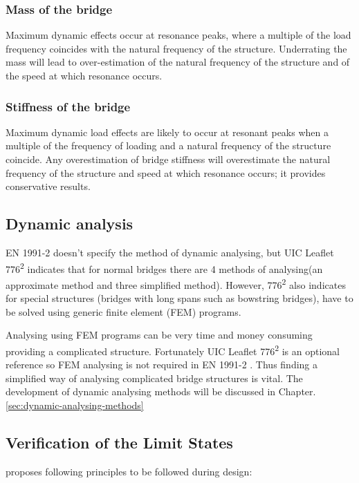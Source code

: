 \subsubsection{Mass of the bridge}
Maximum dynamic effects occur at resonance peaks, where a multiple of the load frequency coincides with the natural frequency of the structure. Underrating the mass will lead to over-estimation of the natural frequency of the structure and of the speed at which resonance occurs.

\subsubsection{Stiffness of the bridge}
Maximum dynamic load effects are likely to occur at resonant peaks when a multiple of the frequency of loading and a natural frequency of the structure coincide. Any overestimation of bridge stiffness will overestimate the natural frequency of the structure and speed at which resonance occurs; it provides conservative results.

\subsection{Dynamic analysis}
EN 1991-2\cite{EC12} doesn't specify the method of dynamic analysing, but UIC Leaflet 776\textsuperscript{2}\cite{uic} indicates that  for normal bridges there are 4 methods of analysing(an approximate method and three simplified method). However, 776\textsuperscript{2}\cite{uic} also indicates for special structures (bridges with long spans such as bowstring bridges), have to be solved using generic finite element (FEM) programs.

Analysing using FEM programs can be very time and money consuming providing a complicated structure. Fortunately UIC Leaflet 776\textsuperscript{2}\cite{uic} is an optional reference so FEM analysing is not required in EN 1991-2 \cite{EC12}. Thus finding a simplified way of analysing complicated bridge structures is vital. The development of dynamic analysing methods will be discussed in Chapter.\ref{sec:dynamic-analysing-methods}

\subsection{Verification of the Limit States}
\cite[6.4.6.5]{EC12} proposes following principles to be followed during design:

